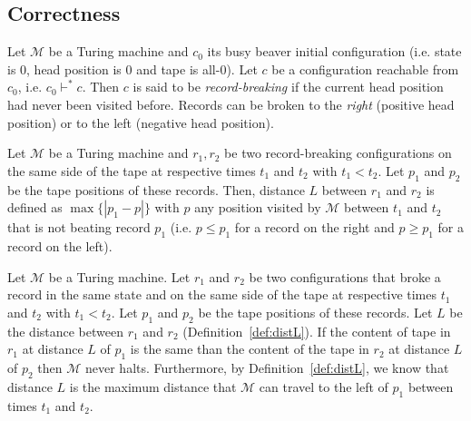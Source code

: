 \subsection{Correctness}

\begin{definition}
  Let $\mathcal{M}$ be a Turing machine and $c_0$ its busy beaver initial configuration (i.e. state is 0, head position is 0 and tape is all-0).
  Let $c$ be a configuration reachable from $c_0$, i.e. $c_0 \vdash^* c$.
  Then $c$ is said to be \textit{record-breaking} if the current head position had never been visited before. Records can be broken to the \textit{right} (positive head position) or to the left (negative head position).
\end{definition}

\begin{definition}\label{def:distL}
  Let $\mathcal{M}$ be a Turing machine and $r_1,r_2$ be two record-breaking configurations on the same side of the tape at respective times $t_1$ and $t_2$ with $t_1 < t_2$. Let $p_1$ and $p_2$ be the tape positions of these records. Then, distance $L$ between $r_1$ and $r_2$ is defined as $\max\{|p_1 - p|\}$ with $p$ any position visited by $\mathcal{M}$ between $t_1$ and $t_2$ that is not beating record $p_1$ (i.e. $p \leq p_1$ for a record on the right and $p \geq p_1$ for a record on the left).
\end{definition}

\begin{lemma}\label{lem:translated-cyclers}
  Let $\mathcal{M}$ be a Turing machine. Let $r_1$ and $r_2$ be two configurations that broke a record in the same state and on the same side of the tape at respective times $t_1$ and $t_2$ with $t_1 < t_2$. Let $p_1$ and $p_2$ be the tape positions of these records. Let $L$ be the distance between $r_1$ and $r_2$ (Definition~\ref{def:distL}). If the content of tape in $r_1$ at distance $L$ of $p_1$ is the same than the content of the tape in $r_2$ at distance $L$ of $p_2$ then $\mathcal{M}$ never halts. Furthermore, by Definition~\ref{def:distL}, we know that distance $L$ is the maximum distance that $\mathcal{M}$ can travel to the left of $p_1$ between times $t_1$ and $t_2$.
\end{lemma}

